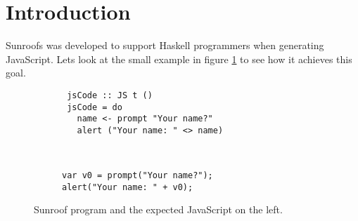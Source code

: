  
\section{Introduction}

Sunroofs was developed to support Haskell programmers 
when generating JavaScript. Lets look at the small example
in figure \ref{fig:code-example} to see how it achieves this goal.

\begin{figure}[h]
\vspace{-0.5cm}
\centering
\begin{subfigure}{0.45\textwidth}%
\begin{verbatim}
 jsCode :: JS t ()
 jsCode = do
   name <- prompt "Your name?"
   alert ("Your name: " <> name)
\end{verbatim}%
\end{subfigure}%
\hfill%
\begin{subfigure}{0.45\textwidth}
\vspace{0.25cm}%
\begin{verbatim}
  
  
var v0 = prompt("Your name?"); 
alert("Your name: " + v0);
\end{verbatim}%
\end{subfigure}%
\caption{Sunroof program and the expected JavaScript on the left.}%
\label{fig:code-example}%
\vspace{-0.5cm}
\end{figure}

